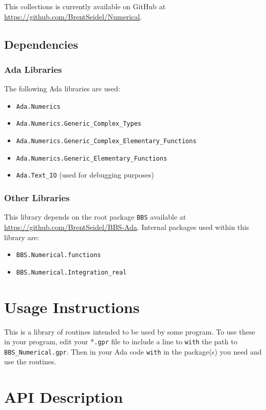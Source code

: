 \documentclass[10pt, openany]{book}
\newcommand{\package}[1]{\texttt{#1}}
\newcommand{\keyword}[1]{\texttt{#1}}
\begin{document}
This collections is currently available on GitHub at \url{https://github.com/BrentSeidel/Numerical}.

\section{Dependencies}
\subsection{Ada Libraries}
The following Ada libraries are used:
\begin{itemize}
  \item \package{Ada.Numerics}
  \item \package{Ada.Numerics.Generic\_Complex\_Types}
  \item \package{Ada.Numerics.Generic\_Complex\_Elementary\_Functions}
  \item \package{Ada.Numerics.Generic\_Elementary\_Functions}
  \item \package{Ada.Text\_IO} (used for debugging purposes)
\end{itemize}
\subsection{Other Libraries}
This library depends on the root package \package{BBS} available at \url{https://github.com/BrentSeidel/BBS-Ada}.
Internal packages used within this library are:
\begin{itemize}
  \item \package{BBS.Numerical.functions}
  \item \package{BBS.Numerical.Integration\_real}
\end{itemize}

\chapter{Usage Instructions}
This is a library of routines intended to be used by some program.  To use these in your program, edit your *\keyword{.gpr} file to include a line to \keyword{with} the path to \keyword{BBS\_Numerical.gpr}.  Then in your Ada code \keyword{with} in the package(s) you need and use the routines.

\chapter{API Description}
\end{document}
